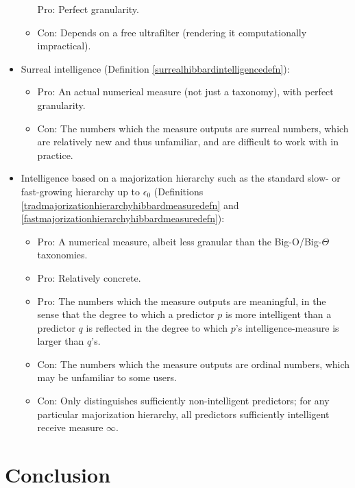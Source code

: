 \documentclass[twoside,11pt]{article}
\begin{document}
\begin{itemize}
\begin{itemize}
        Pro: Perfect granularity.
        \item
        Con: Depends on a free ultrafilter (rendering it
        computationally impractical).
    \end{itemize}
    \item
    Surreal intelligence (Definition \ref{surrealhibbardintelligencedefn}):
    \begin{itemize}
        \item
        Pro: An actual numerical measure (not just a taxonomy), with
        perfect granularity.
        \item
        Con: The numbers which the measure outputs are surreal numbers,
        which are relatively new and thus unfamiliar, and are difficult
        to work with in practice.
    \end{itemize}
    \item
    Intelligence based on a majorization hierarchy such as the
    standard slow- or fast-growing hierarchy up to $\epsilon_0$
    (Definitions \ref{tradmajorizationhierarchyhibbardmeasuredefn}
    and \ref{fastmajorizationhierarchyhibbardmeasuredefn}):
    \begin{itemize}
        \item
        Pro: A numerical measure, albeit less granular than the
        Big-O/Big-$\Theta$ taxonomies.
        \item
        Pro: Relatively concrete.
        \item
        Pro: The numbers which the measure outputs are meaningful, in the sense that
        the degree to which a predictor $p$ is more intelligent than a
        predictor $q$ is reflected
        in the degree to which $p$'s intelligence-measure is larger than $q$'s.
        \item
        Con: The numbers which the measure outputs are ordinal numbers, which may be
        unfamiliar to some users.
        \item
        Con: Only distinguishes sufficiently non-intelligent predictors; for any particular
        majorization hierarchy, all predictors
        sufficiently intelligent receive measure $\infty$.
    \end{itemize}
\end{itemize}

\section{Conclusion}
\label{conclusionsection}
\end{document}
